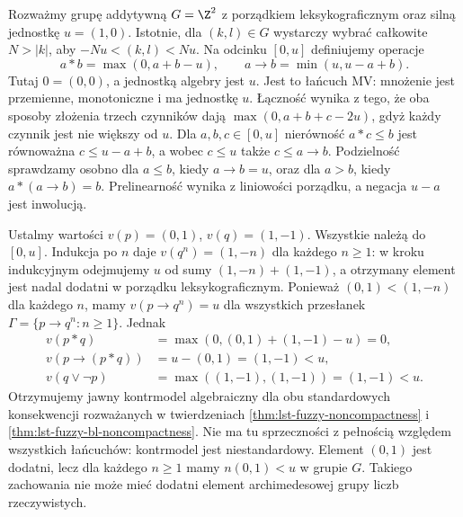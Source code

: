 \begin{przyklad}
\label{ex:ncl-lexicographic-mv}
Rozważmy grupę addytywną $G=\Z^2$ z porządkiem
leksykograficznym oraz silną jednostkę $u=(1,0)$.
Istotnie, dla $(k,l)\in G$ wystarczy wybrać całkowite
$N>|k|$, aby $-Nu<(k,l)<Nu$.
Na odcinku $[0,u]$ definiujemy operacje
\[
 a*b=\max(0,a+b-u),\qquad a\to b=\min(u,u-a+b).
\]
Tutaj $0=(0,0)$, a jednostką algebry jest $u$.
Jest to łańcuch MV: mnożenie jest przemienne,
monotoniczne i ma jednostkę $u$. Łączność wynika
z tego, że oba sposoby złożenia trzech czynników
dają $\max(0,a+b+c-2u)$, gdyż każdy czynnik
jest nie większy od $u$. Dla $a,b,c\in[0,u]$
nierówność $a*c\leq b$ jest równoważna
$c\leq u-a+b$, a wobec $c\leq u$ także
$c\leq a\to b$. Podzielność sprawdzamy osobno
dla $a\leq b$, kiedy $a\to b=u$, oraz dla $a>b$,
kiedy $a*(a\to b)=b$. Prelinearność wynika
z liniowości porządku, a negacja $u-a$ jest inwolucją.

Ustalmy wartości $v(p)=(0,1)$, $v(q)=(1,-1)$.
Wszystkie należą do $[0,u]$. Indukcja po $n$
daje $v(q^n)=(1,-n)$ dla każdego $n\geq1$:
w kroku indukcyjnym odejmujemy $u$ od sumy
$(1,-n)+(1,-1)$, a otrzymany element jest
nadal dodatni w porządku leksykograficznym.
Ponieważ $(0,1)<(1,-n)$ dla każdego $n$, mamy
$v(p\to q^n)=u$ dla wszystkich przesłanek
$\Gamma=\{p\to q^n:n\geq1\}$. Jednak
\[
 \begin{aligned}
 v(p*q)&=\max(0,(0,1)+(1,-1)-u)=0,\\
 v(p\to(p*q))&=u-(0,1)=(1,-1)<u,\\
 v(q\vee\neg p)&=\max((1,-1),(1,-1))=(1,-1)<u.
 \end{aligned}
\]
Otrzymujemy jawny kontrmodel algebraiczny dla obu
standardowych konsekwencji rozważanych w twierdzeniach
\ref{thm:lst-fuzzy-noncompactness} i
\ref{thm:lst-fuzzy-bl-noncompactness}.
Nie ma tu sprzeczności z pełnością względem wszystkich
łańcuchów: kontrmodel jest niestandardowy.
Element $(0,1)$ jest dodatni, lecz dla każdego
$n\geq1$ mamy $n(0,1)<u$ w grupie $G$.
Takiego zachowania nie może mieć dodatni element
archimedesowej grupy liczb rzeczywistych.
\end{przyklad}

